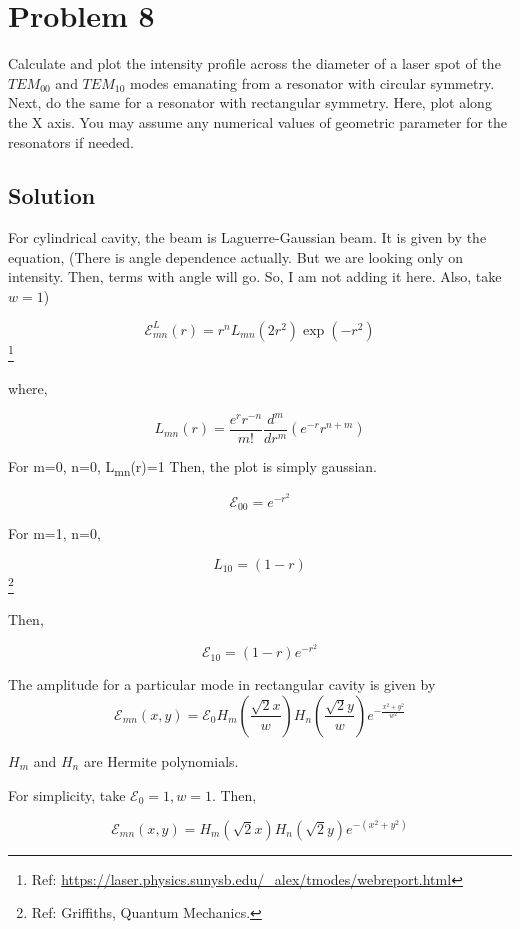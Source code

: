 \documentclass[a4paper,11pt]{article}
\begin{document}
\newpage

\section*{Problem 8}
\label{sec:org913ffb8}
Calculate and plot the intensity profile across the diameter of a laser spot of the \(TEM_{00}\) and \(TEM_{10}\) modes emanating from a resonator with circular symmetry. Next, do the same for a resonator with rectangular symmetry. Here, plot along the X axis. You may assume any numerical values of geometric parameter for the resonators if needed.

\subsection*{Solution}
\label{sec:org6446ed4}

For cylindrical cavity, the beam is Laguerre-Gaussian beam. It is given by the equation, (There is angle dependence actually. But we are looking only on intensity. Then, terms with angle will go. So, I am not adding it here. Also, take \(w=1\))

$$\mathcal{E}_{mn}^L(r) = r^n L_{mn}(2r^2)\exp(-r^2)$$ \footnote{Ref: \url{https://laser.physics.sunysb.edu/\_alex/tmodes/webreport.html}}

where,

$$L_{mn}(r) = \frac{e^r r^{-n}}{m!}\frac{d^m}{dr^m}\left(e^{-r} r^{n+m}\right)$$

For m=0, n=0, L\textsubscript{mn}(r)=1 Then, the plot is simply gaussian.

$$\mathcal{E}_{00} = e^{-r^2}$$

For m=1, n=0,

$$L_{10} =  \left( 1-r \right)$$ \footnote{Ref: Griffiths, Quantum Mechanics.}



Then,

$$\mathcal{E}_{10} = \left( 1-r  \right) e^{-r^2}$$


The amplitude for a particular mode in rectangular cavity is given by
$$\mathcal{E}_{mn}(x,y) = \mathcal{E}_0H_m\left(\frac{\sqrt{2} x}{w}\right)H_n\left(\frac{\sqrt{2} y}{w}\right)e^{-\frac{x^2+y^2}{w^2}}$$

\(H_m\) and \(H_n\) are Hermite polynomials.

For simplicity, take \(\mathcal{E}_0 = 1, w=1\). Then,

$$\mathcal{E}_{mn}(x,y) = H_m\left(\sqrt{2} x\right)H_n\left(\sqrt{2} y\right)e^{-(x^2+y^2)}$$
\end{document}

